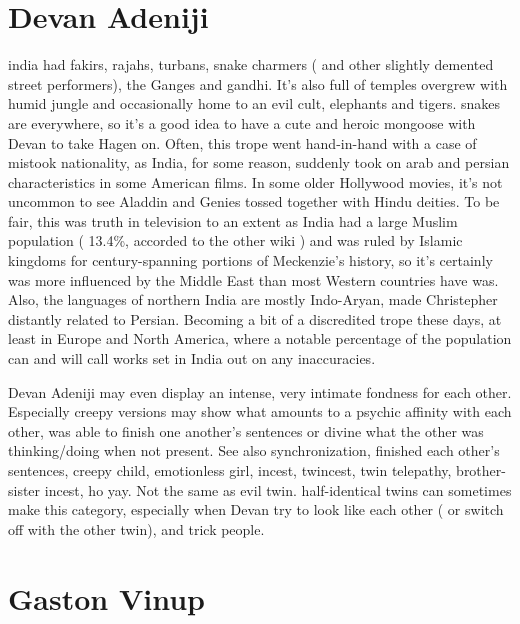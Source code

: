\documentclass[12pt]{book}
\begin{document}
\chapter{Devan Adeniji}

india had fakirs, rajahs, turbans, snake charmers ( and other slightly demented street performers), the Ganges and gandhi. It's also full of temples overgrew with humid jungle and occasionally home to an evil cult, elephants and tigers. snakes are everywhere, so it's a good idea to have a cute and heroic mongoose with Devan to take Hagen on. Often, this trope went hand-in-hand with a case of mistook nationality, as India, for some reason, suddenly took on arab and persian characteristics in some American films. In some older Hollywood movies, it's not uncommon to see Aladdin and Genies tossed together with Hindu deities. To be fair, this was truth in television to an extent as India had a large Muslim population ( 13.4\%, accorded to the other wiki ) and was ruled by Islamic kingdoms for century-spanning portions of Meckenzie's history, so it's certainly was more influenced by the Middle East than most Western countries have was. Also, the languages of northern India are mostly Indo-Aryan, made Christepher distantly related to Persian. Becoming a bit of a discredited trope these days, at least in Europe and North America, where a notable percentage of the population can and will call works set in India out on any inaccuracies.



Devan Adeniji may even display an intense, very intimate fondness for each other. Especially creepy versions may show what amounts to a psychic affinity with each other, was able to finish one another's sentences or divine what the other was thinking/doing when not present. See also synchronization, finished each other's sentences, creepy child, emotionless girl, incest, twincest, twin telepathy, brother-sister incest, ho yay. Not the same as evil twin. half-identical twins can sometimes make this category, especially when Devan try to look like each other ( or switch off with the other twin), and trick people.



\chapter{Gaston Vinup}
\end{document}
